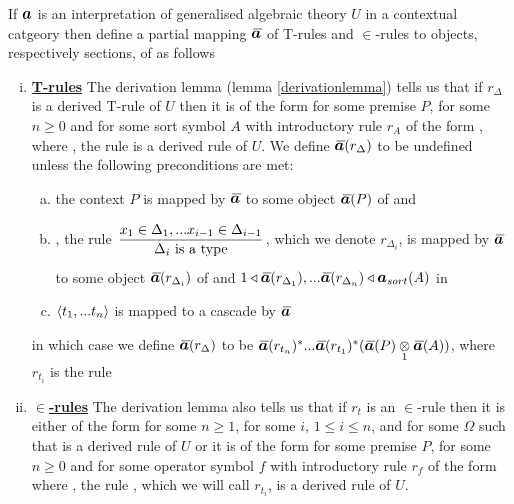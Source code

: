 \begin{definition} 
If $\iI$ is an interpretation of generalised algebraic theory $U$ in a contextual catgeory \catcw
then define a
partial mapping $\Ibar$  of T-rules and $\in$-rules to objects, respectively sections, of \catcw
as follows
\begin{enumerate}[(i)] 
\item \underline{\textbf{T-rules}} 
The derivation lemma (lemma \ref{derivationlemma}) tells us that if $r_\Delta$ is a derived T-rule of $U$  then it is of the form  for some premise $P$, for some $n \geq 0$ and for some sort symbol $A$ with introductory rule $r_A$ of the form , where \foreachi, the rule 
  is a derived rule of $U$. 
We define $\Ibar(r_\Delta)$ to be undefined unless the following preconditions are met:
\begin{enumerate}[(a)]
\item
the context  $P$ is mapped by $\Ibar$ to some object $\Ibar(P)$ of \catcw and 
\item
\foreachi, the rule $\IDelta{i}$, which we denote $r_{\Delta_i}$, is mapped by $\Ibar$ to some object $\Ibar(r_{\Delta_i})$ of \catcw
and $1 \base \Ibar(r_{\Delta_1}),...\Ibar(r_{\Delta_n}) \base \iI_{sort}(A)$ in \catcw 
\item
$\langle t_1,...t_n\rangle$ is mapped to a cascade by $\Ibar$
\end{enumerate}
in which case we define $\Ibar(r_\Delta)$ to be $\Ibar(r_{t_n})^*...\Ibar(r_{t_1})^*(\crossx{\Ibar(P)}{\Ibar(A)}{1})$,
where $r_{t_i}$ is the rule 
\item \underline{\textbf{$\boldsymbol {\in}$-rules}} 
The derivation lemma also tells us that if $r_t$ is an $\in$-rule then it is  
either  of the form  for some $n \ge 1$, for some $i$, $1 \leq i \leq n$, 
and for some $\Omega$ such that  is a derived rule of $U$
or  it is of the form  for some premise $P$, for some $n \geq 0$ and for some operator symbol $f$ with introductory rule $r_f$ of the form  where \foreachi, the rule 
, which we will call $r_{t_i}$, is a derived rule of $U$. 


\end{enumerate}
\end{definition}
